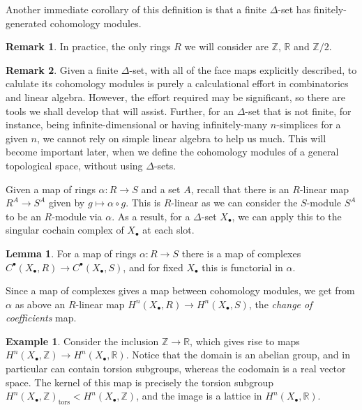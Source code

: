 \documentclass{tufte-handout}
\def\RR{\mathbb{R}}
\def\ZZ{\mathbb{Z}}
\theoremstyle{definition}
\newtheorem{lemma}{Lemma}
\newtheorem{example}{Example}
\newtheorem*{rem}{Remark}
\begin{document}
Another immediate corollary of this definition is that a finite $\Delta$-set has finitely-generated
cohomology modules.

\begin{rem}
In practice, the only rings $R$ we will consider are $\ZZ$, $\RR$ and $\ZZ/2$.
\end{rem}

\begin{rem}
Given a finite $\Delta$-set, with all of the face maps explicitly described, to calulate
its cohomology modules is purely a calculational effort in combinatorics and linear algebra.
However, the effort required may be significant, so there are tools we shall develop that will
assist. Further, for an $\Delta$-set that is not finite, for instance, being 
infinite-dimensional or having infinitely-many $n$-simplices for a given $n$, we cannot rely 
on simple linear algebra to help us much. This will become important later, when we define
the cohomology modules of a general topological space, without using $\Delta$-sets.
\end{rem}

Given a map of rings $\alpha\colon R\to S$ and a set $A$, recall that there is an $R$-linear map 
$R^A\to S^A$ given by $g\mapsto \alpha\circ g$. This is $R$-linear as we can consider
the $S$-module $S^A$ to be an $R$-module via $\alpha$.
As a result, for a $\Delta$-set $X_\bullet$, we can apply this to the singular cochain complex 
of $X_\bullet$ at each slot.

\begin{lemma}
For a map of rings $\alpha\colon R\to S$ there is a map of complexes 
$C^\bullet(X_\bullet,R)\to C^\bullet(X_\bullet,S)$, and for fixed $X_\bullet$ this is functorial
in $\alpha$.
\end{lemma}

Since a map of complexes gives a map between cohomology modules, we get from $\alpha$ as above
an $R$-linear map $H^n(X_\bullet,R) \to H^n(X_\bullet,S)$, the \emph{change of coefficients} map.

\begin{example}
Consider the inclusion $\ZZ\to\RR$, which gives rise to maps 
$H^n(X_\bullet,\ZZ) \to H^n(X_\bullet,\RR)$. Notice that the domain is an abelian group, and in particular
can contain torsion subgroups, whereas the codomain is a real vector space. The kernel of this
map is precisely the torsion subgroup $H^n(X_\bullet,\ZZ)_\mathrm{tors} < H^n(X_\bullet,\ZZ)$, and the image is a lattice in
$H^n(X_\bullet,\RR)$.
\end{example}
\end{document}
